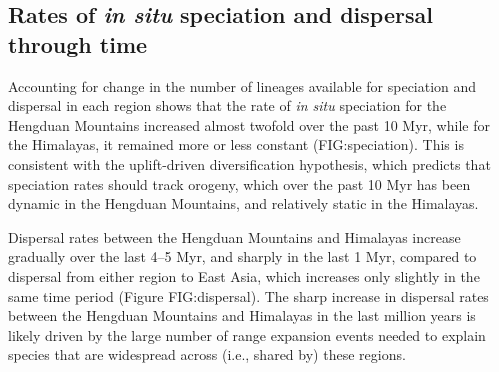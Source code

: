 \subsection{Rates of \textit{in situ} speciation and dispersal through time}

Accounting for change in the number of lineages available for speciation and dispersal in each region shows that the rate of \textit{in situ} speciation for the Hengduan Mountains increased almost twofold over the past 10 Myr, while for the Himalayas, it remained more or less constant (FIG:speciation). This is consistent with the uplift-driven diversification hypothesis, which predicts that speciation rates should track orogeny, which over the past 10 Myr has been dynamic in the Hengduan Mountains, and relatively static in the Himalayas.

Dispersal rates between the Hengduan Mountains and Himalayas increase gradually over the last 4--5 Myr, and sharply in the last 1 Myr, compared to dispersal from either region to East Asia, which increases only slightly in the same time period (Figure FIG:dispersal). The sharp increase in dispersal rates between the Hengduan Mountains and Himalayas in the last million years is likely driven by the large number of range expansion events needed to explain species that are widespread across (i.e., shared by) these regions.
